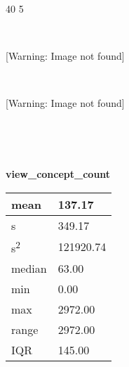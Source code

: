 \documentclass[12pt,twoside]{article}
\begin{document}
40 {\textbar} {\textbar} {\textbar} {\textbar} {\textbar} {\textbar} {\textbar} {\textbar} {\textbar} {\textbar} {\textbar} {\textbar} {\textbar} {\textbar} {\textbar} {\textbar} {\textbar} 5


\bigskip

~ 

 [Warning: Image not found]  



\bigskip

~ 

 [Warning: Image not found]  

\bigskip

~ 

~ 

\textbf{view\_concept\_count} 


\bigskip

\begin{longtable}[l]{|p{1.6712599in}|p{1.7309599in}|}
\hline
mean 
&
137.17 
\\\hline
s 
&
349.17 
\\\hline
s\textsuperscript{2} 
&
121920.74 
\\\hline
median 
&
63.00 
\\\hline
min 
&
0.00 
\\\hline
max 
&
2972.00 
\\\hline
range 
&
2972.00 
\\\hline
IQR 
&
145.00 
\\\hline
\end{longtable}
~ 

~ 

~ 

~ 

~ 

~ 
\end{document}
